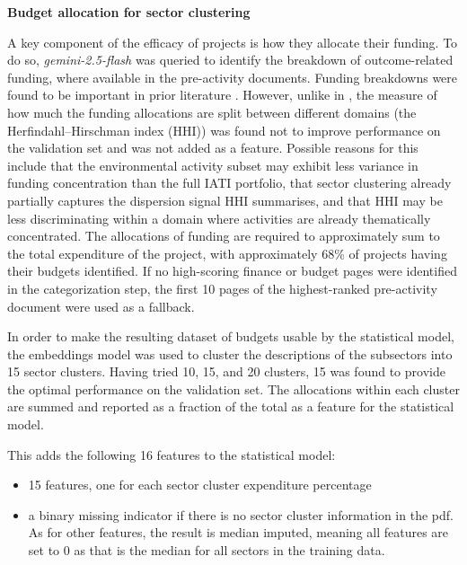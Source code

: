 \textbf{Budget allocation for sector clustering}

A key component of the efficacy of projects is how they allocate their funding. To do so, \emph{gemini-2.5-flash} was queried to identify the breakdown of outcome-related funding, where available in the pre-activity documents. Funding breakdowns were found to be important in prior literature \citep{goldembergMindingGapAid2025}. However, unlike in \citep{goldembergMindingGapAid2025}, the measure of how much the funding allocations are split between different domains (the Herfindahl–Hirschman index (HHI)) was found not to improve performance on the validation set and was not added as a feature. Possible reasons for this include that the environmental activity subset may exhibit less variance in funding concentration than the full IATI portfolio, that sector clustering already partially captures the dispersion signal HHI summarises, and that HHI may be less discriminating within a domain where activities are already thematically concentrated. The allocations of funding are required to approximately sum to the total expenditure of the project, with approximately 68\% of projects having their budgets identified. If no high-scoring finance or budget pages were identified in the categorization step, the first 10 pages of the highest-ranked pre-activity document were used as a fallback.

In order to make the resulting dataset of budgets usable by the statistical model, the embeddings model was used to cluster the descriptions of the subsectors into 15 sector clusters. Having tried 10, 15, and 20 clusters, 15 was found to provide the optimal performance on the validation set. The allocations within each cluster are summed and reported as a fraction of the total as a feature for the statistical model.

This adds the following 16 features to the statistical model:
\begin{itemize}
  \item 15 features, one for each sector cluster expenditure percentage \citep{goldembergMindingGapAid2025}
  \item a binary missing indicator if there is no sector cluster information in the pdf. As for other features, the result is median imputed, meaning all features are set to 0 as that is the median for all sectors in the training data.
\end{itemize}




